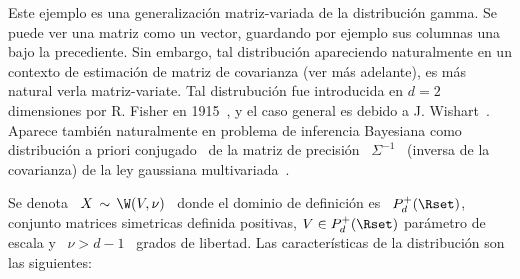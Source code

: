 \label{Sssec:MP:Wishart}

Este ejemplo es una  generalizaci\'on matriz-variada de la distribuci\'on gamma.
Se puede ver  una matriz como un vector, guardando por  ejemplo sus columnas una
bajo la  precediente.  Sin embargo, tal  distribuci\'on apareciendo naturalmente
en un contexto de estimaci\'on de  matriz de covarianza (ver m\'as adelante), es
m\'as natural verla matriz-variate.  Tal distrubuci\'on fue introducida en $d=2$
dimensiones por R. Fisher en 1915~\cite{Fis15}, y el caso general es debido a J.
Wishart~\cite{Wis28,   Mui82,  BilBre99,   GupNag99,  And03,   Seb04}.   Aparece
tambi\'en naturalmente en problema de inferencia Bayesiana como distribuci\'on a
priori  conjugado~  de la  matriz  de precisi\'on  \
$\Sigma^{-1}$   \   (inversa   de   la   covarianza)   de   la   ley   gaussiana
multivariada~\cite[Ec.~(4.4.5)]{Rob07}.

Se denota \  $X \, \sim \, \W(V,\nu)$  \ donde el dominio de  definici\'on es \
$P_d^+(\Rset)$,  conjunto   matrices  simetricas  definida   positivas,  $V  \in
P_d^+(\Rset)$ par\'ametro de  escala y \ $\nu > d-1$ \  grados de libertad.  Las
caracter\'isticas de la distribuci\'on son las siguientes:

